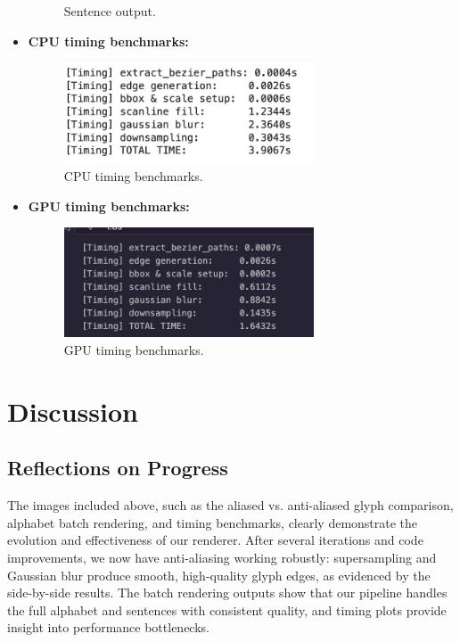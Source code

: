 \documentclass[11pt]{article}
\begin{document}
\begin{itemize}[leftmargin=*,nosep]
\begin{figure}[h]
        \caption{Sentence output.}
    \end{figure}
    \item \textbf{CPU timing benchmarks:}
    \begin{figure}[h]
        \centering
        \includegraphics[width=0.7\textwidth]{../images/CPUTimeBenchmark.jpeg}
        \caption{CPU timing benchmarks.}
    \end{figure}
    \item \textbf{GPU timing benchmarks:}
    \begin{figure}[h]
        \centering
        \includegraphics[width=0.7\textwidth]{../images/GPUTimeBenchmark.jpeg}
        \caption{GPU timing benchmarks.}
    \end{figure}
\end{itemize}
\par

\section{Discussion}

\subsection{Reflections on Progress}
The images included above, such as the aliased vs. anti-aliased glyph comparison, alphabet batch rendering, and timing benchmarks, clearly demonstrate the evolution and effectiveness of our renderer. After several iterations and code improvements, we now have anti-aliasing working robustly: supersampling and Gaussian blur produce smooth, high-quality glyph edges, as evidenced by the side-by-side results. The batch rendering outputs show that our pipeline handles the full alphabet and sentences with consistent quality, and timing plots provide insight into performance bottlenecks. \\
\end{document}
